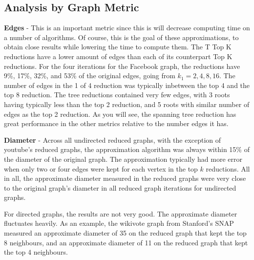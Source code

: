 \documentclass[11pt]{article}
\begin{document}
\subsection{Analysis by Graph Metric}
\textbf{Edges} - This is an important metric since this is will decrease computing time on a number of algorithms.  Of course, this is the goal of these approximations, to obtain close results while lowering the time to compute them.  The T Top K reductions have a lower amount of edges than each of its counterpart Top K reductions. For the four iterations for the Facebook graph, the reductions have 9\%, 17\%, 32\%, and 53\% of the original edges, going from $k_1 = 2, 4, 8, 16$.  The number of edges in the 1 of 4 reduction was typically inbetween the top 4 and the top 8 reduction.  The tree reductions contained very few edges, with 3 roots having typically less than the top 2 reduction, and 5 roots with similar number of edges as the top 2 reduction.  As you will see, the spanning tree reduction has great performance in the other metrics relative to the number edges it has.

\textbf{Diameter} - Across all undirected reduced graphs, with the exception of youtube's reduced graphs, the approximation algorithm was always within 15\% of the diameter of the original graph.  The approximation typically had more error when only two or four edges were kept for each vertex in the top $k$ reductions.  All in all, the approximate diameter measured in the reduced graphs were very close to the original graph's diameter in all reduced graph iterations for undirected graphs.

For directed graphs, the results are not very good.  The approximate diameter fluctuates heavily.  As an example, the wikivote graph from Stanford's SNAP measured an approximate diameter of 35 on the reduced graph that kept the top 8 neighbours, and an approximate diameter of 11 on the reduced graph that kept the top 4 neighbours.
\end{document}
